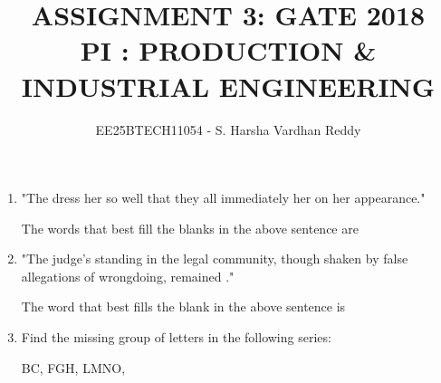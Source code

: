 \documentclass[journal,12pt,onecolumn]{IEEEtran}
\theoremstyle{remark}
\begin{document}
\title{
ASSIGNMENT 3: GATE 2018  \\
PI : PRODUCTION \& INDUSTRIAL ENGINEERING}
\author{EE25BTECH11054 - S. Harsha Vardhan Reddy}
\maketitle
\renewcommand{\thefigure}{\theenumi}
\renewcommand{\thetable}{\theenumi}

\begin{enumerate}

\item "The dress \underline{\hspace{2cm}} her so well that they all immediately \underline{\hspace{2cm}} her on her appearance." \par The words that best fill the blanks in the above sentence are

\hfill{}

\begin{enumerate}
\end{enumerate}

\item "The judge's standing in the legal community, though shaken by false allegations of wrongdoing, remained \underline{\hspace{2cm}}." \par The word that best fills the blank in the above sentence is

\hfill{}

\begin{enumerate}
\end{enumerate}

\item Find the missing group of letters in the following series: \par BC, FGH, LMNO, \underline{\hspace{2cm}}


\end{enumerate}
\end{document}
